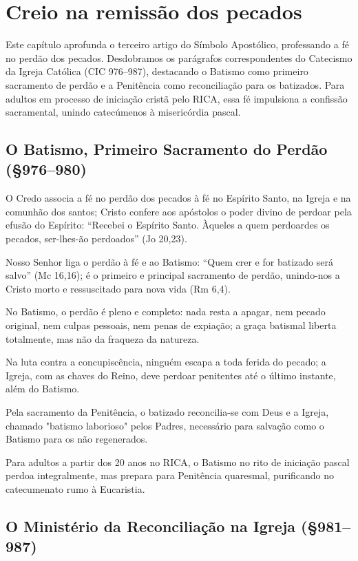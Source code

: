 \chapter{Creio na remissão dos pecados}

Este capítulo aprofunda o terceiro artigo do Símbolo Apostólico, professando a fé no perdão dos pecados. Desdobramos os parágrafos correspondentes do Catecismo da Igreja Católica (CIC 976--987), destacando o Batismo como primeiro sacramento de perdão e a Penitência como reconciliação para os batizados. Para adultos em processo de iniciação cristã pelo RICA, essa fé impulsiona a confissão sacramental, unindo catecúmenos à misericórdia pascal.

\section{O Batismo, Primeiro Sacramento do Perdão (\S 976--980)}

O Credo associa a fé no perdão dos pecados à fé no Espírito Santo, na Igreja e na comunhão dos santos; Cristo confere aos apóstolos o poder divino de perdoar pela efusão do Espírito: ``Recebei o Espírito Santo. Àqueles a quem perdoardes os pecados, ser-lhes-ão perdoados'' (Jo 20,23).

Nosso Senhor liga o perdão à fé e ao Batismo: ``Quem crer e for batizado será salvo'' (Mc 16,16); é o primeiro e principal sacramento de perdão, unindo-nos a Cristo morto e ressuscitado para nova vida (Rm 6,4).

No Batismo, o perdão é pleno e completo: nada resta a apagar, nem pecado original, nem culpas pessoais, nem penas de expiação; a graça batismal liberta totalmente, mas não da fraqueza da natureza.

Na luta contra a concupiscência, ninguém escapa a toda ferida do pecado; a Igreja, com as chaves do Reino, deve perdoar penitentes até o último instante, além do Batismo.

Pela sacramento da Penitência, o batizado reconcilia-se com Deus e a Igreja, chamado "batismo laborioso" pelos Padres, necessário para salvação como o Batismo para os não regenerados.

Para adultos a partir dos 20 anos no RICA, o Batismo no rito de iniciação pascal perdoa integralmente, mas prepara para Penitência quaresmal, purificando no catecumenato rumo à Eucaristia.

\section{O Ministério da Reconciliação na Igreja (\S 981--987)}


